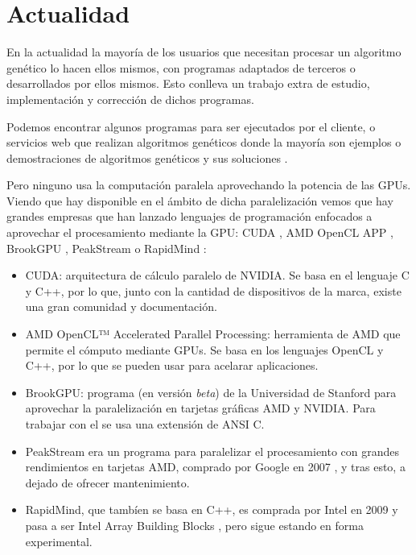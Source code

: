 \newpage
\section{Actualidad}
\bigskip

En la actualidad la mayoría de los usuarios que necesitan procesar un algoritmo genético lo hacen ellos mismos, con programas adaptados de terceros o desarrollados por ellos mismos. Esto conlleva un trabajo extra de estudio, implementación y corrección de dichos programas. 

Podemos encontrar algunos programas \cite{agpython} \cite{agjava} \cite{agmatlab} para ser ejecutados por el cliente, o servicios web que realizan algoritmos genéticos donde la mayoría son ejemplos o demostraciones de algoritmos genéticos y sus soluciones \cite{agandar} \cite{agcoche}.


Pero ninguno usa la computación paralela aprovechando la potencia de las GPUs. Viendo que hay disponible en el ámbito de dicha paralelización vemos que hay grandes empresas que han lanzado lenguajes de programación enfocados a aprovechar el procesamiento mediante la GPU: CUDA \cite{nvidiacuda}, AMD OpenCL APP \cite{paralelizacionamd}, BrookGPU \cite{brookgpu}, PeakStream \cite{peackstream} o RapidMind \cite{rapidmind}:

\begin{itemize}
	\item CUDA: arquitectura de cálculo paralelo de NVIDIA. Se basa en el lenguaje C y C++, por lo que, junto con la cantidad de dispositivos de la marca, existe una gran comunidad y documentación.
	
	\item AMD OpenCL™ Accelerated Parallel Processing: herramienta de AMD que permite el cómputo mediante GPUs. Se basa en los lenguajes OpenCL y C++, por lo que se pueden usar para acelarar aplicaciones.
	
	\item BrookGPU: programa (en versión \textit{beta}) de la Universidad de Stanford para aprovechar la paralelización en tarjetas gráficas AMD y NVIDIA. Para trabajar con el se usa una extensión de ANSI C.
	
	\item PeakStream era un programa para paralelizar el procesamiento con grandes rendimientos en tarjetas AMD, comprado por Google en 2007 \cite{peackstreamcomprada}, y tras esto, a dejado de ofrecer mantenimiento.
	
	\item RapidMind, que tambíen se basa en C++, es comprada por Intel en 2009 y pasa a ser Intel Array Building Blocks \cite{rapidmindcomprada}, pero sigue estando en forma experimental. 
	
\end{itemize}

